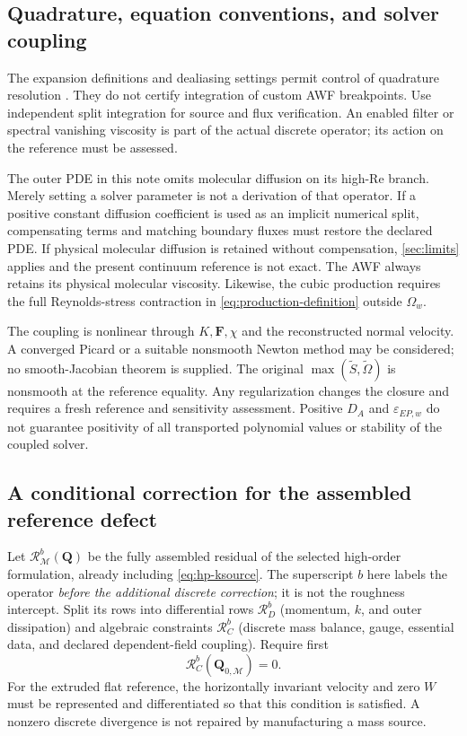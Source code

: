 \documentclass[11pt,a4paper]{article}
\numberwithin{equation}{section}
\newcommand{\eps}{\varepsilon}
\newcommand{\EEP}{\eps_{EP,w}}
\begin{document}
\subsection{Quadrature, equation conventions, and solver coupling}
The expansion definitions and dealiasing settings permit control of
quadrature resolution \cite{NektarExpansions,NektarSpaces}. They do not
certify integration of custom AWF breakpoints. Use independent split
integration for source and flux verification. An enabled filter or
spectral vanishing viscosity is part of the actual discrete operator;
its action on the reference must be assessed.

The outer PDE in this note omits molecular diffusion on its high-Re
branch. Merely setting a solver parameter is not a derivation of that
operator. If a positive constant diffusion coefficient is used as an
implicit numerical split, compensating terms and matching boundary
fluxes must restore the declared PDE. If physical molecular diffusion
is retained without compensation, \cref{sec:limits} applies and the
present continuum reference is not exact. The AWF always retains its
physical molecular viscosity. Likewise, the cubic production requires
the full Reynolds-stress contraction in \cref{eq:production-definition}
outside $\Omega_w$.

The coupling is nonlinear through $K,\bm F,\chi$ and the reconstructed
normal velocity. A converged Picard or a suitable nonsmooth Newton
method may be considered; no smooth-Jacobian theorem is supplied.
The original $\max(\widetilde S,\widetilde\Omega)$ is nonsmooth at
the reference equality. Any regularization changes the closure and
requires a fresh reference and sensitivity assessment. Positive
$D_A$ and $\EEP$ do not guarantee positivity of all transported
polynomial values or stability of the coupled solver.

\subsection{A conditional correction for the assembled reference defect}
\label{sec:hp-defect}
Let $\mathcal R^b_{\mathcal M}(\bm Q)$ be the fully assembled residual
of the selected high-order formulation, already including
\cref{eq:hp-ksource}. The superscript $b$ here labels the operator
\emph{before the additional discrete correction}; it is not the
roughness intercept. Split its rows into differential rows
$\mathcal R_D^b$ (momentum, $k$, and outer dissipation) and algebraic
constraints $\mathcal R_C^b$ (discrete mass balance, gauge, essential
data, and declared dependent-field coupling). Require first
\begin{equation}
 \mathcal R_C^b(\bm Q_{0,\mathcal M})=0.
 \label{eq:hp-constraints}
\end{equation}
For the extruded flat reference, the horizontally invariant velocity
and zero $W$ must be represented and differentiated so that this
condition is satisfied. A nonzero discrete divergence is not repaired
by manufacturing a mass source.
\end{document}
